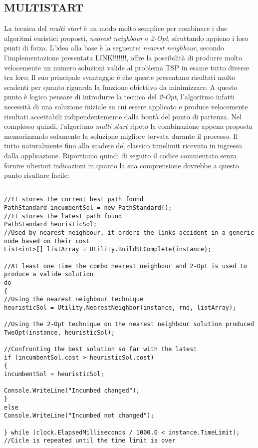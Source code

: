 \documentclass[11pt]{article}
\begin{document}
\subsection*{MULTISTART}
\label{sec:MultiStartS}

La tecnica del \textit{multi start} è un modo molto semplice per combinare i due algoritmi euristici proposti, \textit{nearest neighbour} e \textit{2-Opt}, sfruttando appieno i loro punti di forza.
L'idea alla base è la seguente: \textit{nearest neighbour}, secondo l'implementazione presentata LINK!!!!!!!, offre la possibilità di produrre molto velocemente un numero soluzioni valide al problema TSP in esame tutto diverse tra loro; Il suo principale svantaggio è che queste presentano risultati molto scadenti per quanto riguarda la funzione obiettivo da minimizzare. A questo punto è logico pensare di introdurre la tecnica del \textit{2-Opt}, l'algoritmo infatti necessità di una soluzione iniziale su cui essere applicato e produce velocemente risultati accettabili indipendentemente dalla bontà del punto di partenza.
Nel complesso quindi, l'algoritmo \textit{multi start} ripeto la combinazione appena proposta memorizzando solamente la soluzione migliore torvata durante il processo. Il tutto naturalmente fino allo scadere del classico timelimit ricevuto in ingresso dalla applicazione.
Riportiamo quindi di seguito il codice commentato senza fornire ulteriori indicazioni in quanto la sua comprensione dovrebbe a questo punto risultare facile:

\begin{lstlisting}

//It stores the current best path found
PathStandard incumbentSol = new PathStandard();
//It stores the latest path found
PathStandard heuristicSol;
//Used by nearest neighbour, it orders the links accident in a generic node based on their cost
List<int>[] listArray = Utility.BuildSLComplete(instance);

//At least one time the combo nearest neighbour and 2-Opt is used to produce a valide solution
do
{
//Using the nearest neighbour technique
heuristicSol = Utility.NearestNeighbor(instance, rnd, listArray);

//Using the 2-Opt technique on the nearest neighbour solution produced
TwoOpt(instance, heuristicSol);

//Confronting the best solution so far with the latest
if (incumbentSol.cost > heuristicSol.cost)
{
incumbentSol = heuristicSol;

Console.WriteLine("Incumbed changed");
}
else
Console.WriteLine("Incumbed not changed");

} while (clock.ElapsedMilliseconds / 1000.0 < instance.TimeLimit); //Cicle is repeated until the time limit is over

\end{lstlisting}
\end{document}
